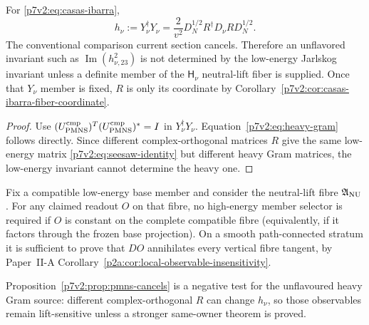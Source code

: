\documentclass[11pt,a4paper]{article}
\newcommand{\Hnu}{\mathsf{H}_{\nu}}
\newcommand{\YN}{Y_\nu}
\begin{document}
\begin{proposition}
\label{p7v2:prop:pmns-cancels}
For \eqref{p7v2:eq:casas-ibarra},
\begin{equation}
\label{p7v2:eq:heavy-gram}
 h_\nu:=\YN^\dagger\YN
 =
 \frac{2}{v^2}
 D_N^{1/2}R^\dagger D_\nu R D_N^{1/2}.
\end{equation}
The conventional comparison current section cancels.  Therefore an unflavored invariant such as
\(\operatorname{Im}(h_{\nu,23}^2)\) is not determined by the low-energy
Jarlskog invariant unless a definite member of the \(\Hnu\) neutral-lift
fiber is supplied.  Once that \(Y_\nu\) member is fixed, \(R\) is only its
coordinate by Corollary~\ref{p7v2:cor:casas-ibarra-fiber-coordinate}.
\end{proposition}

\begin{proof}
Use \((U_{\rm PMNS}^{\rm cmp})^T(U_{\rm PMNS}^{\rm cmp})^{*}=I\) in
\(\YN^\dagger\YN\).  Equation~\eqref{p7v2:eq:heavy-gram} follows directly.
Since different complex-orthogonal matrices \(R\) give the same low-energy
matrix \eqref{p7v2:eq:seesaw-identity} but different heavy Gram matrices, the
low-energy invariant cannot determine the heavy one.
\end{proof}

\begin{corollary}
\label{p7v2:cor:neutral-lift-observable-quotient}
Fix a compatible low-energy base member and consider the neutral-lift fibre
$\mathfrak A_{\rm NU}$.  For any claimed readout $O$ on that fibre, no
high-energy member selector is required if $O$ is constant on the complete
compatible fibre (equivalently, if it factors through the frozen base
projection).  On a smooth path-connected stratum it is sufficient to prove
that $DO$ annihilates every vertical fibre tangent, by Paper~II-A
Corollary~\ref{p2a:cor:local-observable-insensitivity}.

Proposition~\ref{p7v2:prop:pmns-cancels} is a negative test for the unflavoured
heavy Gram source: different complex-orthogonal $R$ can change $h_\nu$, so
those observables remain lift-sensitive unless a stronger same-owner theorem
is proved.
\end{corollary}
\end{document}
